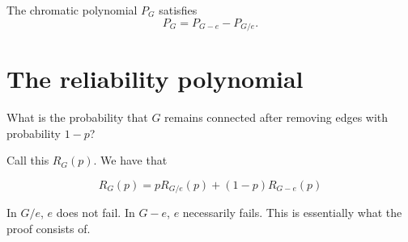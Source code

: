 \documentclass{article}
\begin{document}
\begin{prop}
  The chromatic polynomial $P_G$ satisfies
  $$P_G = P_{G-e} - P_{G/e}.$$
\end{prop}

\section{The reliability polynomial}
What is the probability that $G$ remains connected after removing edges with
probability $1-p$?

Call this $R_G(p)$. We have that

\begin{thm}
$$R_G(p) = pR_{G/e}(p) + (1-p)R_{G-e}(p)$$
\end{thm}

In $G/e$, $e$ does not fail. In $G-e$, $e$ necessarily fails. This is
essentially what the proof consists of.
\end{document}
